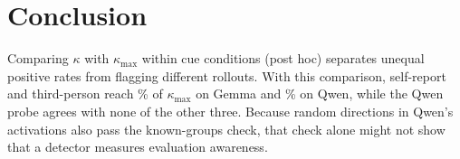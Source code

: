 \section{Conclusion}
\label{sec:conclusion}

Comparing $\kappa$ with $\kappa_{\max}$ within cue conditions (post hoc) separates unequal
positive rates from flagging different rollouts. With this comparison, self-report and
third-person reach \% of $\kappa_{\max}$ on Gemma and
\% on Qwen, while the Qwen probe agrees with
none of the other three. Because random directions in Qwen's activations also pass the
known-groups check, that check alone might not show that a detector measures evaluation awareness.
